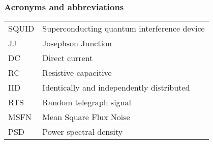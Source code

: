 \newpage
\subsubsection*{Acronyms and abbreviations}

\begingroup
\renewcommand{\arraystretch}{1.2}
\begin{tabular}{@{}p{2.5cm} l}
    SQUID      & Superconducting quantum interference device \\
    JJ         & Josephson Junction \\
    DC         & Direct current \\
    RC         & Resistive-capacitive \\ 
    IID        & Identically and independently distributed \\
    RTS        & Random telegraph signal \\
    MSFN       & Mean Square Flux Noise \\
    PSD        & Power spectral density \\
\end{tabular}
\endgroup
